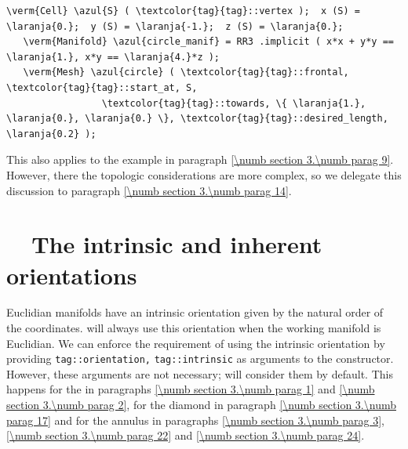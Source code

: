 \begin{Verbatim}[commandchars=\\\{\},formatcom=\small\tt,
   baselinestretch=0.94,framesep=2mm                     ]
   \verm{Cell} \azul{S} ( \textcolor{tag}{tag}::vertex );  x (S) = \laranja{0.};  y (S) = \laranja{-1.};  z (S) = \laranja{0.};
   \verm{Manifold} \azul{circle_manif} = RR3 .implicit ( x*x + y*y == \laranja{1.}, x*y == \laranja{4.}*z );
   \verm{Mesh} \azul{circle} ( \textcolor{tag}{tag}::frontal, \textcolor{tag}{tag}::start_at, S,
                 \textcolor{tag}{tag}::towards, \{ \laranja{1.}, \laranja{0.}, \laranja{0.} \}, \textcolor{tag}{tag}::desired_length, \laranja{0.2} );
\end{Verbatim}

This also applies to the example in paragraph \ref{\numb section 3.\numb parag 9}.
However, there the topologic considerations are more complex, so we delegate this
discussion to paragraph \ref{\numb section 3.\numb parag 14}.


\section{~~The intrinsic and inherent orientations}\label{\numb section 3.\numb parag 13}

Euclidian manifolds have an intrinsic orientation given by the natural order of the
coordinates.
{\ManiFEM} will always use this orientation when the working manifold is Euclidian.
We can enforce the requirement of using the intrinsic orientation by providing
{\small\tt\textcolor{tag}{tag}::orientation,} {\small\tt\textcolor{tag}{tag}::intrinsic}
as arguments to the {\small\tt{}} constructor.
However, these arguments are not necessary; {\maniFEM} will consider them by default.
This happens for the {\small\tt{}} in paragraphs \ref{\numb section 3.\numb parag 1} and
\ref{\numb section 3.\numb parag 2}, for the diamond in
paragraph \ref{\numb section 3.\numb parag 17} and for the annulus in paragraphs
\ref{\numb section 3.\numb parag 3}, \ref{\numb section 3.\numb parag 22}
and \ref{\numb section 3.\numb parag 24}.

